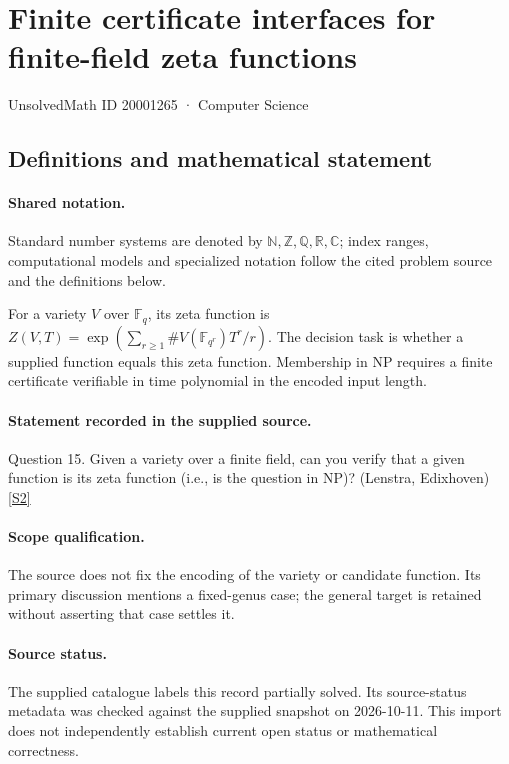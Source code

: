 \documentclass[11pt]{article}
\newcommand{\sref}[2]{\hyperlink{source:#1:#2}{[S#2]}}
\begin{document}
\setcounter{section}{20001264}
\section{Finite certificate interfaces for finite-field zeta functions}\label{20001265}
{\small\sffamily UnsolvedMath ID 20001265 · Computer Science}
\subsection{Definitions and mathematical statement}

\paragraph{Shared notation.}Standard number systems are denoted by $\mathbb N,\mathbb Z,\mathbb Q,\mathbb R,\mathbb C$; index ranges, computational models and specialized notation follow the cited problem source and the definitions below.


For a variety $V$ over $\mathbb F_q$, its zeta function is $Z(V,T)=\exp(\sum_{r\ge1}\#V(\mathbb F_{q^r})T^r/r)$. The decision task is whether a supplied function equals this zeta function. Membership in NP requires a finite certificate verifiable in time polynomial in the encoded input length.
\paragraph{Statement recorded in the supplied source.}
Question 15. Given a variety over a finite field, can you verify that a given function is its zeta function (i.e., is the question in NP)? (Lenstra, Edixhoven) \sref{20001265}{2}
\paragraph{Scope qualification.}
The source does not fix the encoding of the variety or candidate function. Its primary discussion mentions a fixed-genus case; the general target is retained without asserting that case settles it.
\paragraph{Source status.}
The supplied catalogue labels this record partially solved. Its source-status metadata was checked against the supplied snapshot on 2026-10-11. This import does not independently establish current open status or mathematical correctness.
\end{document}
